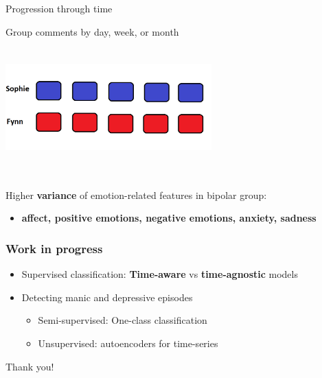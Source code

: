 \begin{frame}{Progression through time}

Group comments by day, week, or month
\includegraphics[width=300,height=200,keepaspectratio]{fig/obojano_malo.png}

    Higher \textbf{variance} of emotion-related features in bipolar group:
    \begin{itemize}
        \item \textbf{affect, positive emotions, negative emotions, anxiety, sadness}
    \end{itemize}   
\end{frame}

\begin{frame}
  \frametitle{Work in progress}
  \begin{itemize}
    \item Supervised classification: \textbf{Time-aware} vs \textbf{time-agnostic} models
    \item Detecting manic and depressive episodes
    \begin{itemize}
        \item Semi-supervised: One-class classification
        \item Unsupervised: autoencoders for time-series
    \end{itemize}

  \end{itemize}
\end{frame}

\begin{frame}
  \centering
  \huge{Thank you!}
\end{frame}

